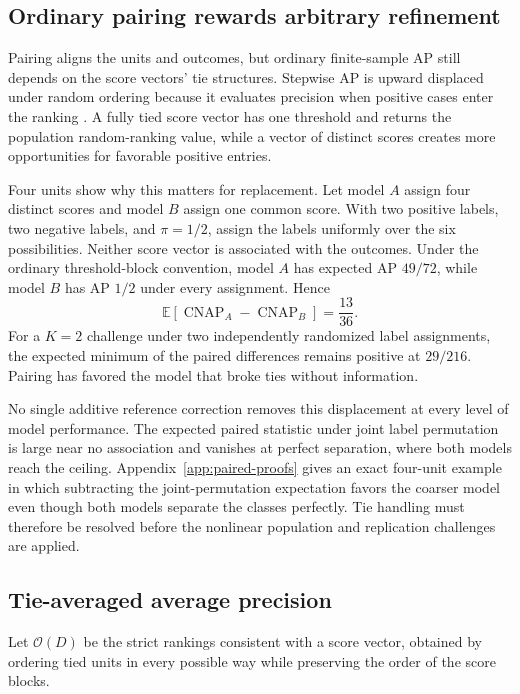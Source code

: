 \documentclass[11pt]{article}
\newcommand{\CNAP}{\operatorname{CNAP}}
\newcommand{\E}{\mathbb{E}}
\theoremstyle{remark}
\begin{document}
\subsection{Ordinary pairing rewards arbitrary refinement}

Pairing aligns the units and outcomes, but ordinary finite-sample AP still depends on the score vectors' tie structures. Stepwise AP is upward displaced under random ordering because it evaluates precision when positive cases enter the ranking \cite{bestgen2015random}. A fully tied score vector has one threshold and returns the population random-ranking value, while a vector of distinct scores creates more opportunities for favorable positive entries.

Four units show why this matters for replacement. Let model $A$ assign four distinct scores and model $B$ assign one common score. With two positive labels, two negative labels, and $\pi=1/2$, assign the labels uniformly over the six possibilities. Neither score vector is associated with the outcomes. Under the ordinary threshold-block convention, model $A$ has expected AP $49/72$, while model $B$ has AP $1/2$ under every assignment. Hence
\[
\E[\CNAP_A-\CNAP_B]
=
\frac{13}{36}.
\]
For a $K=2$ challenge under two independently randomized label assignments, the expected minimum of the paired differences remains positive at $29/216$. Pairing has favored the model that broke ties without information.

No single additive reference correction removes this displacement at every level of model performance. The expected paired statistic under joint label permutation is large near no association and vanishes at perfect separation, where both models reach the ceiling. Appendix~\ref{app:paired-proofs} gives an exact four-unit example in which subtracting the joint-permutation expectation favors the coarser model even though both models separate the classes perfectly. Tie handling must therefore be resolved before the nonlinear population and replication challenges are applied.

\subsection{Tie-averaged average precision}
\label{sec:tie-average}

Let $\mathcal O(D)$ be the strict rankings consistent with a score vector, obtained by ordering tied units in every possible way while preserving the order of the score blocks.
\end{document}
